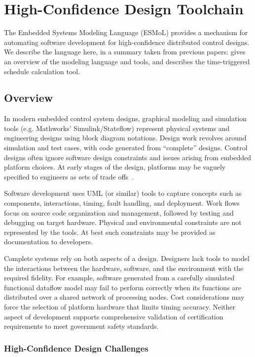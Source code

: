 \chapter{High-Confidence Design Toolchain}
\label{ch:esmol}

The Embedded Systems Modeling Language (ESMoL) provides a mechanism for automating software development for high-confidence 
distributed control designs.  We describe the language here, in a summary taken from previous papers:
\cite{modeling:esmol} gives an overview of the modeling language and tools, and \cite{sched:analysis}
describes the time-triggered schedule calculation tool.

\section{Overview}

In modern embedded control system designs, graphical modeling and simulation tools (e.g. Mathworks' 
Simulink/Stateflow) represent physical systems and engineering designs using block diagram notations. 
Design work revolves around simulation and test cases, with code generated from "`complete"' designs. 
Control designs often ignore software design constraints and issues arising from embedded platform 
choices. At early stages of the design, platforms may be vaguely specified to engineers as sets of 
trade offs~\cite{modeling:platform}.

Software development uses UML (or similar) tools to capture concepts such as components, interactions, 
timing, fault handling, and deployment. Work flows focus on source code organization and management, 
followed by testing and debugging on target hardware. Physical and environmental constraints are not 
represented by the tools. At best such constraints may be provided as documentation to developers.

Complete systems rely on both aspects of a design.  Designers lack tools to model the interactions 
between the hardware, software, and the environment with the required fidelity.  For example, software 
generated from a carefully simulated functional dataflow model may 
fail to perform correctly when its functions are distributed over a 
shared network of processing nodes.  Cost considerations may force the
selection of platform hardware that limits timing accuracy.  Neither 
aspect of development supports comprehensive validation of certification 
requirements to meet government safety standards. 

\subsection{High-Confidence Design Challenges}

